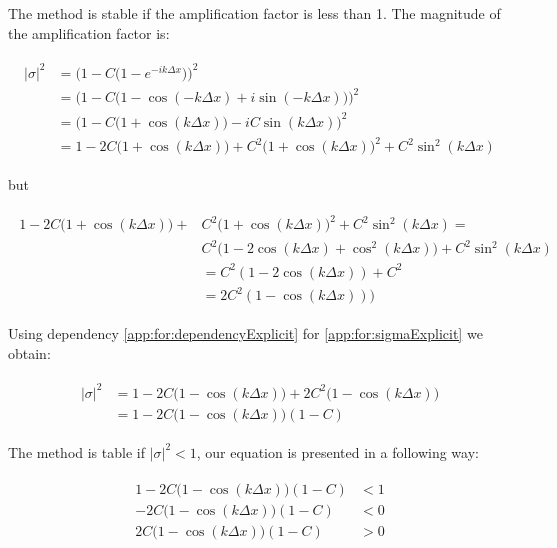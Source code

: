 	The method is stable if the amplification factor is less than 1. The magnitude of the amplification factor is:
	
	\begin{align}
		\begin{split}
			\label{app:for:sigmaExplicit}
			|\sigma|^2 &= \Bigg( 1 - C\Big(1 - e^{-ik\Delta x}\Big)\Bigg)^2 \\
			&= \Bigg( 1 - C\Big(1 -\cos(-k\Delta x) + i\sin(-k\Delta x)\Big)\Bigg)^2 \\
			&= \Bigg(1 - C\Big(1 +\cos(k\Delta x)\Big) - iC\sin(k\Delta x)\Bigg)^2 \\	
			&= 1 - 2C\Big(1 + \cos(k\Delta x)\Big) + C^2\Big(1 +\cos(k\Delta x)\Big)^2 + C^2\sin^2(k\Delta x)
		\end{split}
	\end{align} 
	
	but
	
	\begin{align}
		\begin{split}
			\label{app:for:dependencyExplicit}
			1 - 2C\Big(1 + \cos(k\Delta x)\Big) + &C^2\Big(1 +\cos(k\Delta x)\Big)^2 + C^2\sin^2(k\Delta x) = \\&C^2\Bigg(1 - 2\cos(k\Delta x) + \cos^2(k\Delta x)\Bigg) + C^2\sin^2(k\Delta x) \\
			&= C^2(1-2\cos(k\Delta x)) + C^2 \\
			&= 2C^2(1-\cos(k\Delta x)))
		\end{split}
	\end{align} 
	
	Using dependency \ref{app:for:dependencyExplicit} for \ref{app:for:sigmaExplicit} we obtain:
	
	\begin{align}
		\begin{split}
			|\sigma|^2 &= 1 - 2C\Big(1-\cos(k\Delta x)\Big) + 2C^2\Big(1 - \cos(k\Delta x)\Big) \\
			&= 1-2C\Big(1-\cos(k\Delta x)\Big)(1-C)
		\end{split}
	\end{align} 
	
	The method is table if $|\sigma|^2 < 1$, our equation is presented in a following way:
	
	\begin{align}
		\begin{split}
			1-2C\Big(1-\cos(k\Delta x)\Big)(1-C) &< 1 \\
			-2C\Big(1-\cos(k\Delta x)\Big)(1-C) &< 0 \\
			2C\Big(1-\cos(k\Delta x)\Big)(1-C) &>0 \\
		\end{split}
	\end{align} 
	
